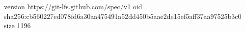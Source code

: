 version https://git-lfs.github.com/spec/v1
oid sha256:cb560227ed078fd6a30aa475491a52dd450b5aae2de15ef5aff37aa97525b3c0
size 1196
